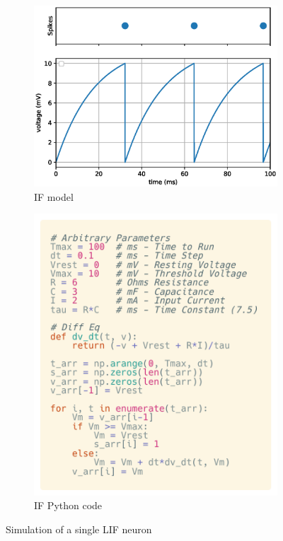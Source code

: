 \begin{figure}[h!]
    \begin{subfigure}{.6\textwidth}
        \centering
        \includegraphics[width=1.0\linewidth]{figures/graphs/singleSpikingNeuron.eps}
        \caption{IF model}
        \label{fig:LIFSingleSpikeGraph}
    \end{subfigure}%
    \begin{subfigure}{.5\textwidth}
        \centering
        \includegraphics[width=1.0\linewidth]{figures/code/SingleLIFCode.png}
        \caption{IF Python code}
        \label{fig:LIFCode}
    \end{subfigure}
    \caption{Simulation of a single LIF neuron}
    \label{fig:LIFSingleSpikeGraphCode}
\end{figure}

